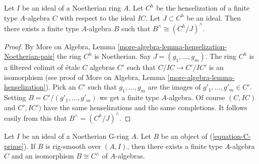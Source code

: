 \begin{lemma}
\label{lemma-algebraize-easy}
Let $I$ be an ideal of a Noetherian ring $A$. Let $C^h$ be the henselization
of a finite type $A$-algebra $C$ with respect to the ideal $IC$. Let
$J \subset C^h$ be an ideal. Then there exists a finite type $A$-algebra
$B$ such that $B^\wedge \cong (C^h/J)^\wedge$.
\end{lemma}

\begin{proof}
By More on Algebra, Lemma
\ref{more-algebra-lemma-henselization-Noetherian-pair}
the ring $C^h$ is Noetherian. Say $J = (g_1, \ldots, g_m)$.
The ring $C^h$ is a filtered colimit of \'etale $C$ algebras $C'$
such that $C/IC \to C'/IC'$ is an isomorphism
(see proof of More on Algebra, Lemma \ref{more-algebra-lemma-henselization}).
Pick an $C'$ such that $g_1, \ldots, g_m$ are the
images of $g'_1, \ldots, g'_m \in C'$.
Setting $B = C'/(g'_1, \ldots, g'_m)$ we get a finite
type $A$-algebra. Of course $(C, IC)$ and $C', IC')$ have
the same henselizations and the same completions.
It follows easily from this that $B^\wedge = (C^h/J)^\wedge$.
\end{proof}

\begin{proposition}
\label{proposition-approximate}
Let $I$ be an ideal of a Noetherian G-ring $A$. Let $B$ be an
object of (\ref{equation-C-prime}). If $B$ is rig-smooth
over $(A, I)$, then there exists a finite type $A$-algebra
$C$ and an isomorphism $B \cong C^\wedge$ of $A$-algebras.
\end{proposition}

